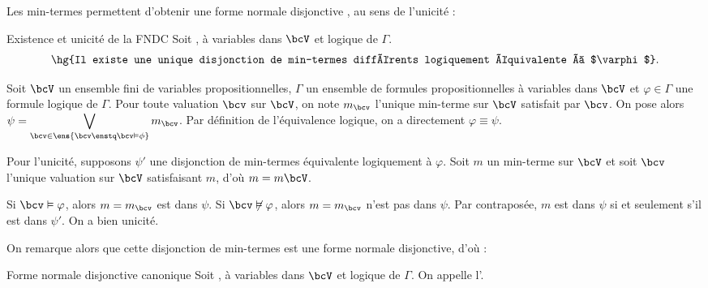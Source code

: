     Les min-termes permettent d'obtenir une forme normale disjonctive , au sens de l'unicité :
    \begin{corollary}{Existence et unicité de la FNDC}{}
        Soit ,  à variables dans $\bcV$ et  logique de $\Gamma$.
        \[ \text{\hg{Il existe une unique disjonction de min-termes différents logiquement équivalente à $\varphi$}.} \]
    \end{corollary}
    \begin{nproof}
        Soit $\bcV$ un ensemble fini de variables propositionnelles, $\Gamma$ un ensemble de formules propositionnelles à variables dans $\bcV$ et $\varphi \in \Gamma$ une formule logique de $\Gamma$. Pour toute valuation $\bcv$ sur $\bcV$, on note $m_\bcv$ l'unique min-terme sur $\bcV$ satisfait par $\bcv$. On pose alors $\psi = \displaystyle\bigvee_{\bcv \in \ens{\bcv \enstq \bcv \vDash \phi}} m_\bcv$. Par définition de l'équivalence logique, on a directement $\varphi \equiv \psi$.\medskip
        
        Pour l'unicité, supposons $\psi'$ une disjonction de min-termes équivalente logiquement à $\varphi$. Soit $m$ un min-terme sur $\bcV$ et soit $\bcv$ l'unique valuation sur $\bcV$ satisfaisant $m$, d'où $m = m\bcV$. 
        
        Si $\bcv \vDash \varphi$, alors $m = m_\bcv$ est dans $\psi$. Si $\bcv \not\vDash \varphi$, alors $m = m_\bcv$ n'est pas dans $\psi$. Par contraposée, $m$ est dans $\psi$ si et seulement s'il est dans $\psi'$. On a bien unicité.
    \end{nproof}
    
    On remarque alors que cette disjonction de min-termes est une forme normale disjonctive, d'où :
    \begin{definition}{Forme normale disjonctive canonique}{}
        Soit ,  à variables dans $\bcV$ et  logique de $\Gamma$. On appelle  l'.
    \end{definition}
    
    